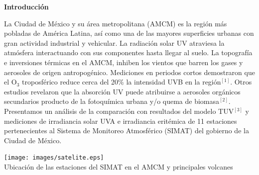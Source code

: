 \documentclass{article}
\begin{document}
\begin{minipage}{0.45\linewidth}
\begin{center}
\begin{shaded}
\textbf{\textcolor{ver}{Introducción}}
\end{shaded}
\end{center}
La Ciudad de México y su área metropolitana (AMCM) es la región más
pobladas de América Latina, así como una de las mayores superficies
urbanas con gran actividad industrial y vehicular.
La radiación solar UV atraviesa la atmósfera interactuando con sus
componentes hasta llegar al suelo. La topografía e inversiones térmicas
en el AMCM, inhiben los vientos que barren los gases y aerosoles de
origen antropogénico. Mediciones en periodos cortos demostraron que
el O$_3$ troposférico reduce cerca del 20\% la intensidad UVB en la
región$^{[1]}$. Otros estudios revelaron que la absorción UV puede atribuirse
a aerosoles orgánicos secundarios producto de la fotoquímica urbana
y/o quema de biomasa$^{[2]}$. Presentamos un análisis de la comparación
con resultados del modelo TUV$^{[3]}$ y mediciones de irradiancia solar UVA
e irradiancia eritémica de 11 estaciones pertenecientes al Sistema de
Monitoreo Atmosférico (SIMAT) del gobierno de la Ciudad de México.\vspace{-0.9cm}\\
\begin{center}
\texttt{[image: images/satelite.eps]}\\
\changefontsizes{9.5pt}
\textcolor{bl}{Ubicación de las estaciones del SIMAT en el AMCM y principales volcanes}
\end{center}
\end{minipage}
\hspace{0.7cm}
\end{document}
